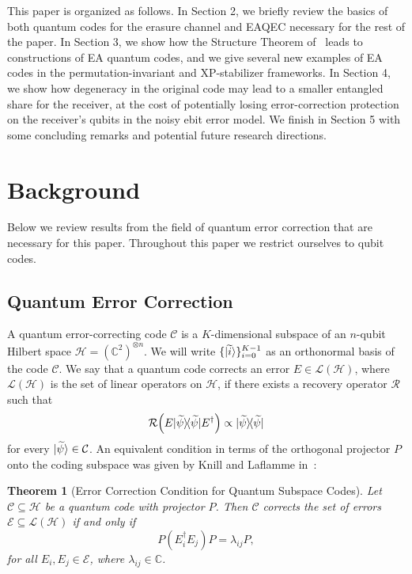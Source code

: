 \documentclass[]{amsart}
\DeclarePairedDelimiter\bra{\langle}{\rvert}
\DeclarePairedDelimiter\ket{\lvert}{\rangle}
\newtheorem{theorem}{Theorem}
\begin{document}
This paper is organized as follows. In Section 2, we briefly review the basics of both quantum codes for the erasure channel and EAQEC necessary for the rest of the paper. In Section 3, we show how the Structure Theorem of~\cite{CHKNN2025} leads to constructions of EA quantum codes, and we give several new examples of EA codes in the permutation-invariant and XP-stabilizer frameworks. In Section 4, we show how degeneracy in the original code may lead to a smaller entangled share for the receiver, at the cost of potentially losing error-correction protection on the receiver's qubits in the noisy ebit error model. We finish in Section 5 with some concluding remarks and potential future research directions.

\section{Background}

Below we review results from the field of quantum error correction that are necessary for this paper.
Throughout this paper we restrict ourselves to qubit codes.

\subsection{Quantum Error Correction}

A quantum error-correcting code $\mathcal{C}$ is a $K$-dimensional subspace of an $n$-qubit Hilbert space $\mathcal{H}=(\mathbb{C}^2)^{\otimes n}$.
We will write $\{\ket{\widetilde{i}}\}_{i=0}^{K-1}$ as an orthonormal basis of the code $\mathcal{C}$.
We say that a quantum code corrects an error $E\in\mathcal{L\!\left(H\right)}$, where $\mathcal{L\!\left(H\right)}$ is the set of linear operators on $\mathcal{H}$, if there exists a recovery operator $\mathcal{R}$ such that 
\begin{equation}
    \mathcal{R}\!\left(E\ket{\widetilde{\psi}}\!\bra{\widetilde{\psi}}E^\dagger\right)\propto \ket{\widetilde{\psi}}\!\bra{\widetilde{\psi}}
\end{equation}
for every $\ket{\widetilde{\psi}}\in\mathcal{C}$.
An equivalent condition in terms of the orthogonal projector $P$ onto the coding subspace was given by Knill and Laflamme in~\cite{KL1997}:
\begin{theorem}[Error Correction Condition for Quantum Subspace Codes]\label{thm:klcond}
    Let $\mathcal{C}\subseteq\mathcal{H}$ be a quantum code with projector $P$. Then $\mathcal{C}$ corrects the set of errors $\mathcal{E}\subseteq\mathcal{L}\!\left(\mathcal{H}\right)$ if and only if 
    \begin{equation}
        P\left(E_i^\dagger E_j\right)P=\lambda_{ij}P,
    \end{equation}
    for all $E_i,E_j\in\mathcal{E}$, where $\lambda_{ij}\in\mathbb{C}$.
\end{theorem}
\end{document}
